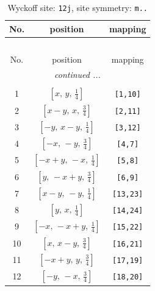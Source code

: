 \documentclass[fleqn,8pt]{jsarticle}
\begin{document}
\begin{longtable}{ccc}
\caption{Wyckoff site: {\tt 12j}, site symmetry: {\tt m..}}
 \\
 \hline \hline
No. & position & mapping \\ \hline \endfirsthead

\multicolumn{2}{l}{\tablename\ \thetable{}} \\
 \hline \hline
No. & position & mapping \\ \hline \endhead

 \hline \hline
\multicolumn{2}{r}{\footnotesize\it continued ...} \\ \endfoot

 \hline \hline
\multicolumn{2}{r}{} \\ \endlastfoot

1 & $\left[ x,\, y,\, \frac{1}{4} \right]$ & {\tt [1,10]} \\ \hline
2 & $\left[ x - y,\, x,\, \frac{3}{4} \right]$ & {\tt [2,11]} \\ \hline
3 & $\left[ - y,\, x - y,\, \frac{1}{4} \right]$ & {\tt [3,12]} \\ \hline
4 & $\left[ - x,\, - y,\, \frac{3}{4} \right]$ & {\tt [4,7]} \\ \hline
5 & $\left[ - x + y,\, - x,\, \frac{1}{4} \right]$ & {\tt [5,8]} \\ \hline
6 & $\left[ y,\, - x + y,\, \frac{3}{4} \right]$ & {\tt [6,9]} \\ \hline
7 & $\left[ x - y,\, - y,\, \frac{1}{4} \right]$ & {\tt [13,23]} \\ \hline
8 & $\left[ y,\, x,\, \frac{1}{4} \right]$ & {\tt [14,24]} \\ \hline
9 & $\left[ - x,\, - x + y,\, \frac{1}{4} \right]$ & {\tt [15,22]} \\ \hline
10 & $\left[ x,\, x - y,\, \frac{3}{4} \right]$ & {\tt [16,21]} \\ \hline
11 & $\left[ - x + y,\, y,\, \frac{3}{4} \right]$ & {\tt [17,19]} \\ \hline
12 & $\left[ - y,\, - x,\, \frac{3}{4} \right]$ & {\tt [18,20]} \\
\end{longtable}
\renewcommand{\arraystretch}{1.2}
\end{document}

